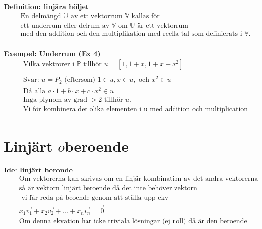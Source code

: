 \textbf{Definition: linjära höljet}
\begin{align*}
  &\quad  \text{En delmängd $\mathbb{U}$ av ett vektorrum $\mathbb{V}$ kallas för } \\
  &\quad  \text{ett underrum eller delrum av $\mathbb{V}$ om $\mathbb{U}$ är ett vektorrum} \\
  &\quad  \text{med den addition och den multiplikation med reella tal som definierats i
    $\mathbb{V}$.} \\
\end{align*}

\textbf{Exempel: Underrum (Ex 4)}
\begin{align*}
  &\quad  \text{Vilka vektrorer i $\mathbb{P}$ tillhör } u=[1, 1+x, 1+x+x^2] \\
  &\quad  \\
  &\quad  \text{Svar: } u=P_2 \text{ (eftersom) } 1\in{u}, x\in{u}, \text{ och } x^2\in{u} \\
  &\quad  \text{Då alla } a\cdot{1} + b\cdot{x} + c\cdot{x^2} \in{u} \\
  &\quad  \text{Inga plynom av grad $>2$ tillhör $u$.} \\
  &\quad  \text{Vi för kombinera det olika elementen i u med addition och multiplication} \\
\end{align*}

\section{Linjärt \(o\)beroende}
\textbf{Ide: linjärt beronde}
\begin{align*}
  &\quad  \text{Om vektorerna kan skrivas om en linjär kombination av det andra vektorerna} \\
  &\quad  \text{så är vektorn linjärt beroende då det inte behöver vektorn} \\
  &\quad  \text{ vi får reda på beoende genom att ställa upp ekv} \\
  &\quad  x_1\vec{v_1}+x_2\vec{v_2} + \ldots{} + x_n\vec{v_n} = \vec{0} \\
  &\quad  \text{Om denna ekvation har icke triviala lösningar (ej noll) då är den beroende} \\
\end{align*}


